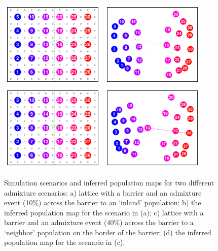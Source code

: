 \documentclass[12pt]{article}
\begin{document}
\begin{figure}[htp!]
	\centering
			{\includegraphics[width=2in,height=1.66in]{figs/sims/barr_inland_ad_lattice.pdf}}
			{\includegraphics[width=2in,height=1.66in]{figs/sims/GeoGenMap_barr_inland_admixture_1.pdf}}
			{\includegraphics[width=2in,height=1.66in]{figs/sims/big_barr_ad_lattice.pdf}}
			{\includegraphics[width=2in,height=1.66in]{figs/sims/GeoGenMap_big_barr_ad_1.pdf}}
	\caption{
    Simulation scenarios and inferred population maps for two different admixture scenarios: a) lattice with a barrier and an admixture event (10\%) across the barrier to an `inland' population; b) the inferred population map for the scenario in (a); c) lattice with a barrier and an admixture event (40\%) across the barrier to a `neighbor' population on the border of the barrier; (d) the inferred population map for the scenario in (c).
}\label{sfig:barr_inland_ad}
\end{figure}
\end{document}
